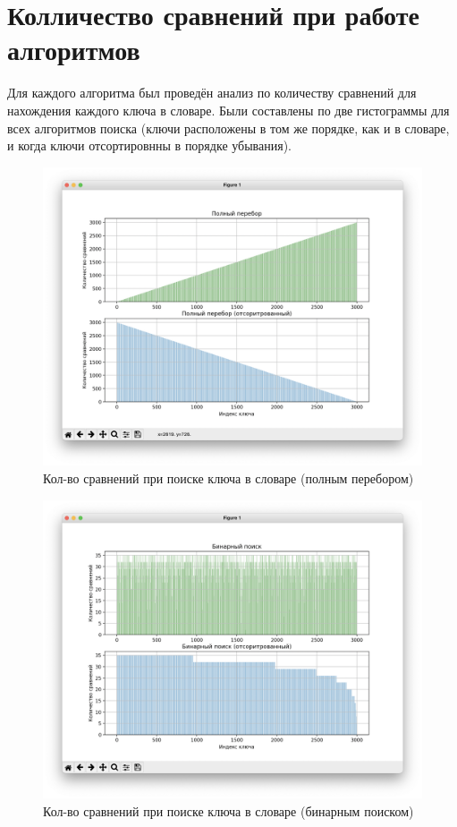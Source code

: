 \documentclass[12pt,a4paper]{report}
\begin{document}
\section{Колличество сравнений при работе алгоритмов}

Для каждого алгоритма был проведён анализ по количеству сравнений для нахождения каждого ключа в словаре. Были составлены по две гистограммы для всех алгоритмов поиска (ключи расположены в том же порядке, как и в словаре, и когда ключи отсортировнны в порядке убывания).


\begin{figure}[h]
	\centering
	\includegraphics[scale=0.45]{graph_full_search.png}
	\caption{Кол-во сравнений при поиске ключа в словаре (полным перебором)}
	\label{fig:graph_full_search}
\end{figure}

\clearpage

\begin{figure}[h]
	\centering
	\includegraphics[scale=0.45]{graph_binary_search.png}
	\caption{Кол-во сравнений при поиске ключа в словаре (бинарным поиском)}
	\label{fig:graph_binary_search}
\end{figure}
\end{document}
